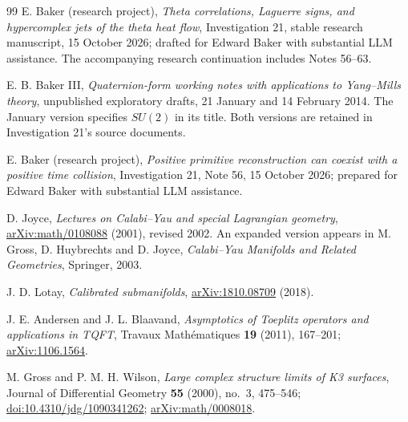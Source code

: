\documentclass[11pt]{article}
\numberwithin{equation}{section}
\theoremstyle{definition}
\theoremstyle{remark}
\begin{document}
\begin{thebibliography}{99}
E. Baker (research project),
\emph{Theta correlations, Laguerre signs, and hypercomplex jets of the theta heat flow},
Investigation 21, stable research manuscript, 15 October 2026;
drafted for Edward Baker with substantial LLM assistance.
The accompanying research continuation includes Notes 56--63.

E. B. Baker III,
\emph{Quaternion-form working notes with applications to Yang--Mills theory},
unpublished exploratory drafts, 21 January and 14 February 2014.
The January version specifies $SU(2)$ in its title.
Both versions are retained in Investigation 21's source documents.

E. Baker (research project),
\emph{Positive primitive reconstruction can coexist with a positive time collision},
Investigation 21, Note 56, 15 October 2026;
prepared for Edward Baker with substantial LLM assistance.

D. Joyce,
\emph{Lectures on Calabi--Yau and special Lagrangian geometry},
\href{https://arxiv.org/abs/math/0108088}{arXiv:math/0108088} (2001),
revised 2002. An expanded version appears in
M. Gross, D. Huybrechts and D. Joyce, \emph{Calabi--Yau Manifolds and
Related Geometries}, Springer, 2003.

J. D. Lotay,
\emph{Calibrated submanifolds},
\href{https://arxiv.org/abs/1810.08709}{arXiv:1810.08709} (2018).

J. E. Andersen and J. L. Blaavand,
\emph{Asymptotics of Toeplitz operators and applications in TQFT},
Travaux Math\'ematiques \textbf{19} (2011), 167--201;
\href{https://arxiv.org/abs/1106.1564}{arXiv:1106.1564}.

M. Gross and P. M. H. Wilson,
\emph{Large complex structure limits of K3 surfaces},
Journal of Differential Geometry \textbf{55} (2000), no.~3, 475--546;
\href{https://doi.org/10.4310/jdg/1090341262}{doi:10.4310/jdg/1090341262};
\href{https://arxiv.org/abs/math/0008018}{arXiv:math/0008018}.


\end{thebibliography}
\end{document}
